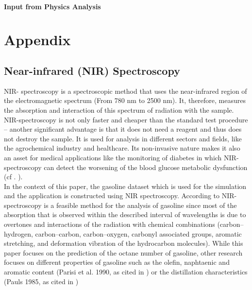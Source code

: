 \documentclass[11pt,twoside,a4paper]{article}
\begin{document}
	\paragraph{Input from Physics Analysis}
	\vspace{-0.2cm}
	
	\nocite{James.2009} %
	
	\newpage
	\section{Appendix}
	
	\subsection{Near-infrared (NIR) Spectroscopy}
	NIR- spectroscopy is a spectroscopic method that uses the near-infrared region of the electromagnetic spectrum (From 780 nm to 2500 nm). It, therefore, measures the absorption and interaction of this spectrum of radiation with the sample. NIR-spectroscopy is not only faster and cheaper than the standard test procedure – another significant advantage is that it does not need a reagent and thus does not destroy the sample. It is used for analysis in different sectors and fields, like the agrochemical industry and healthcare. Its non-invasive nature makes it also an asset for medical applications like the monitoring of diabetes in which NIR-spectroscopy can detect the worsening of the blood glucose metabolic dysfunction (cf . \cite{FR_li_et_al_2020}). \\
	In the context of this paper, the gasoline dataset which is used for the simulation and the application is constructed using NIR spectroscopy. According to \cite{Bohacs_Ovadi_Salgo1998} NIR-spectroscopy is a feasible method for the analysis of gasoline since most of the absorption that is observed within the described interval of wavelengths is due to overtones and interactions of the radiation with chemical combinations (carbon–hydrogen, carbon–carbon, carbon–oxygen, carbonyl associated groups, aromatic stretching, and deformation vibration of the hydrocarbon molecules). While this paper focuses on the prediction of the octane number of gasoline, other research focuses  on different properties of gasoline such as the olefin, naphtaenic and aromatic content (Parisi et al. 1990, as cited in \cite{Bohacs_Ovadi_Salgo1998}) or the distillation characteristics (Pauls 1985, as cited in \cite{Bohacs_Ovadi_Salgo1998})
\end{document}
